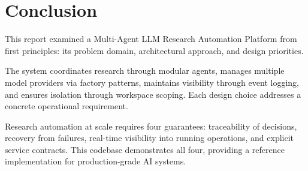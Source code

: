 \documentclass[12pt, a4paper]{article}
\begin{document}
\section{Conclusion}

This report examined a Multi-Agent LLM Research Automation Platform from first principles: its problem domain, architectural approach, and design priorities.

The system coordinates research through modular agents, manages multiple model providers via factory patterns, maintains visibility through event logging, and ensures isolation through workspace scoping. Each design choice addresses a concrete operational requirement.

Research automation at scale requires four guarantees: traceability of decisions, recovery from failures, real-time visibility into running operations, and explicit service contracts. This codebase demonstrates all four, providing a reference implementation for production-grade AI systems.
\end{document}

